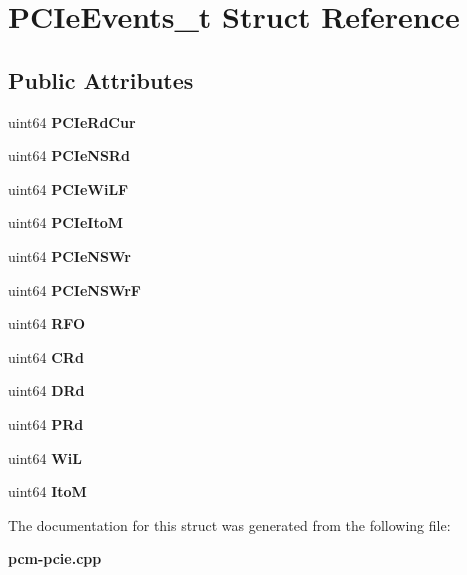 \section{P\+C\+Ie\+Events\+\_\+t Struct Reference}
\label{structPCIeEvents__t}
\subsection*{Public Attributes}
\begin{DoxyCompactItemize}
\item 
uint64 {\bfseries P\+C\+Ie\+Rd\+Cur}\label{structPCIeEvents__t_a433814915b2f0fb5673db7d42b5c8f01}

\item 
uint64 {\bfseries P\+C\+Ie\+N\+S\+Rd}\label{structPCIeEvents__t_a72c70536a99db58c0ffbee2b0f949cb9}

\item 
uint64 {\bfseries P\+C\+Ie\+Wi\+L\+F}\label{structPCIeEvents__t_a11255eae6dfabbe8f64f7b5ea818cd8a}

\item 
uint64 {\bfseries P\+C\+Ie\+Ito\+M}\label{structPCIeEvents__t_a6361b1a7d4ef44d4a9ce98be95ef1f98}

\item 
uint64 {\bfseries P\+C\+Ie\+N\+S\+Wr}\label{structPCIeEvents__t_adc09e10dc946626835a246c2ad23f673}

\item 
uint64 {\bfseries P\+C\+Ie\+N\+S\+Wr\+F}\label{structPCIeEvents__t_afd92992ddfa7437bc37846ce8b26298b}

\item 
uint64 {\bfseries R\+F\+O}\label{structPCIeEvents__t_a22e3b41c0ce557fdbb8ff95b467ffbeb}

\item 
uint64 {\bfseries C\+Rd}\label{structPCIeEvents__t_a6eb5d5b01e893a54069d20a1e8ab1e00}

\item 
uint64 {\bfseries D\+Rd}\label{structPCIeEvents__t_aacf52abcf1e3417903975e9287b3ab8d}

\item 
uint64 {\bfseries P\+Rd}\label{structPCIeEvents__t_af24f33e0b4ed7b25606d5ef495b70c37}

\item 
uint64 {\bfseries Wi\+L}\label{structPCIeEvents__t_a34ae70c8bf61d8a8d50fd671a3fb62b8}

\item 
uint64 {\bfseries Ito\+M}\label{structPCIeEvents__t_a09e7e597f7eb1b569e6aefbe02dbf790}

\end{DoxyCompactItemize}


The documentation for this struct was generated from the following file\+:\begin{DoxyCompactItemize}
\item 
{\bf pcm-\/pcie.\+cpp}\end{DoxyCompactItemize}
